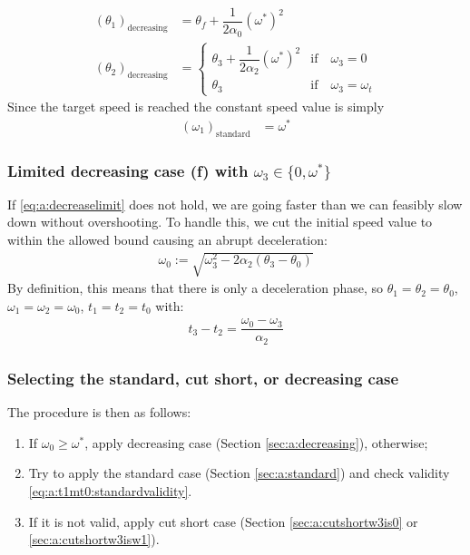 \documentclass[12pt, a4paper]
{article}
\providecommand{\lr}[1]{\left(#1\right)}
\providecommand{\sub}[1]{_{\text{#1}}}
\providecommand{\w}{\omega}
\providecommand{\wt}{\w^*}
\renewcommand{\th}{\theta}
\renewcommand{\a}{\alpha}
\begin{document}
\begin{align}
    \label{eq:a:t1mt0:decreasing}
    \lr{\th_1}\sub{decreasing} &= \th_f  + \dfrac{1}{2\a_0}(\wt)^2\\[1em]
    \lr{\th_2}\sub{decreasing} &=
        \begin{cases}
        \th_3  + \dfrac{1}{2\a_2}(\wt)^2 & \text{if} \quad \w_3 = 0\\ 
        \th_3 &  \text{if} \quad\w_3 = \w_t
        \end{cases}
\end{align}
%
Since the target speed is reached the constant speed value is simply
\begin{align}
    \lr{\w_1}\sub{standard} &= \wt
\end{align}

\subsubsection{Limited decreasing case (f) with $\w_3 \in \{0, \wt\}$}

If \eqref{eq:a:decreaselimit} does not hold, we are going faster than we
can feasibly slow down without overshooting. To handle this, we cut the
initial speed value to within the allowed bound causing an abrupt deceleration:
%
\begin{align}
    \w_0 := \sqrt{\w_3^2 - 2\a_2\lr{\th_3-\th_0}}
\end{align}
%
By definition, this means that there is only a deceleration phase, so
$\th_1 = \th_2 = \th_0$, $\w_1=\w_2=\w_0$, $t_1=t_2=t_0$ with:
%
\begin{align}
    \label{eq:a:decreaselimittime}
    t_3 - t_2 = \dfrac{\w_0-\w_3}{\a_2}
\end{align}

\subsubsection{Selecting the standard, cut short, or decreasing case}
\label{sec:a:selectionprocedure}
The procedure is then as follows:
\begin{enumerate}
    \item If $\w_0 \geq \wt$, apply decreasing case (Section
    \ref{sec:a:decreasing}), otherwise;
    \item Try to apply the standard case (Section \ref{sec:a:standard}) and
    check validity \eqref{eq:a:t1mt0:standardvalidity}.
    \item If it is not valid, apply cut short case (Section
    \ref{sec:a:cutshortw3is0} or \ref{sec:a:cutshortw3isw1}).
\end{enumerate}
%
\end{document}
